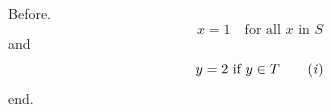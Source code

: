 \documentclass[10pt]{article}
\begin{document}
Before.
\[ x = 1 \quad \text{for all $x$ in $S$} \]
and
\begin{equation} y = 2 \text{ if $y \in T$} \tag{\emph{i}} \end{equation}
end.
\end{document}
